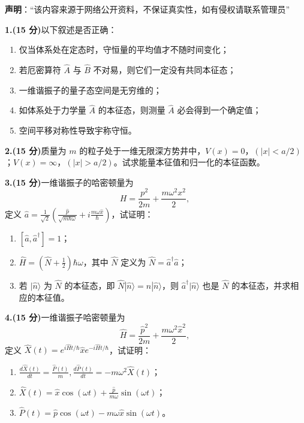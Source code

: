 
\textbf{声明}：“该内容来源于网络公开资料，不保证真实性，如有侵权请联系管理员”

\textbf{1.(15 分)}以下叙述是否正确：

\begin{enumerate}
    \item  仅当体系处在定态时，守恒量的平均值才不随时间变化；
    \item  若厄密算符 $\hat{A}$ 与 $\hat{B}$ 不对易，则它们一定没有共同本征态；
    \item  一维谐振子的量子态空间是无穷维的；
    \item  如体系处于力学量 $\hat{A}$ 的本征态，则测量 $\hat{A}$ 必会得到一个确定值；
    \item  空间平移对称性导致宇称守恒。
\end{enumerate}

\textbf{2.(15 分)}质量为 $m$ 的粒子处于一维无限深方势井中，$V(x) = 0$，$(|x| < a/2)$；$V(x) = \infty$，$(|x| > a/2)$。试求能量本征值和归一化的本征函数。

\textbf{3.(15 分)}一维谐振子的哈密顿量为 
$$H = \frac{p^2}{2m} + \frac{m\omega^2 x^2}{2},~$$ 
定义 $\hat{a} = \frac{1}{\sqrt{2}} \left( \frac{\hat{p}}{\sqrt{m\hbar \omega}} + i\frac{m\omega \hat{x}}{\hbar} \right)$，试证明：
\begin{enumerate}
    \item  $[\hat{a}, \hat{a}^\dagger] = 1$；
    \item  $\hat{H} = (\hat{N} + \frac{1}{2})\hbar \omega$，其中 $\hat{N}$ 定义为 $\hat{N} = \hat{a}^\dagger \hat{a}$；
    \item  若 $|\hat{n}\rangle$ 为 $\hat{N}$ 的本征态，即 $\hat{N}|\hat{n}\rangle = n|\hat{n}\rangle$，则 $\hat{a}^\dagger|\hat{n}\rangle$ 也是 $\hat{N}$ 的本征态，并求相应的本征值。
\end{enumerate}

\textbf{4.(15 分)}一维谐振子哈密顿量为 
$$\hat{H} = \frac{\hat{p}^2}{2m} + \frac{m\omega^2 \hat{x}^2}{2},~$$ 
定义 $\hat{X}(t) = e^{i\hat{H}t/\hbar} \hat{x} e^{-i\hat{H}t/\hbar}$，试证明：
\begin{enumerate}
    \item  $\frac{d\hat{X}(t)}{dt} = \frac{\hat{P}(t)}{m}, \frac{d\hat{P}(t)}{dt} = -m\omega^2 \hat{X}(t)$；
    \item  $\hat{X}(t) = \hat{x} \cos(\omega t) + \frac{\hat{p}}{m\omega} \sin(\omega t)$；
    \item  $\hat{P}(t) = \hat{p} \cos(\omega t) - m\omega \hat{x} \sin(\omega t)$。
\end{enumerate}